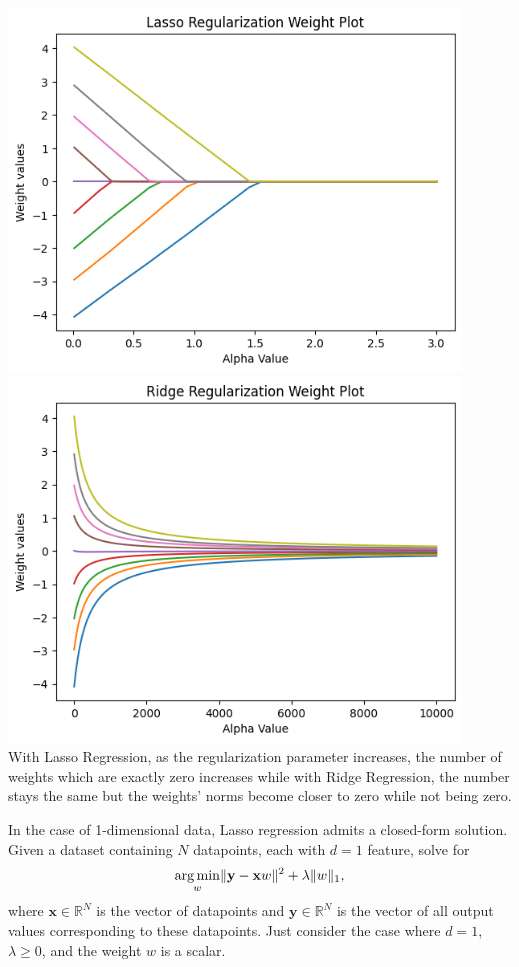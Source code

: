 \begin{solution}
  \\
  \includegraphics[width=12cm]{images/P3_A_lasso.png} \\
  \includegraphics[width=12cm]{images/P3_A_ridge.png} \\

  With Lasso Regression, as the regularization parameter increases, the number of weights which are exactly zero increases while with Ridge Regression, the number stays the same but the weights' norms become closer to zero while not being zero.
\end{solution}

\problem[7]

\subproblem
In the case of 1-dimensional data, Lasso regression admits a closed-form solution.
Given a dataset containing $N$ datapoints, each with $d = 1$ feature, solve for
\[\underset{w}{\operatorname{arg\,min}} \Vert\mathbf{y} - \mathbf{x}w\Vert^2 + \lambda\Vert w\Vert_1,
\]
where $\mathbf{x} \in \mathbb{R}^{N}$ is the vector of datapoints and $\mathbf{y} \in \mathbb{R}^N$ is the  vector of all output values corresponding to these datapoints. Just consider the case where $d = 1$, $\lambda \geq 0$, and the weight $w$ is a scalar.

